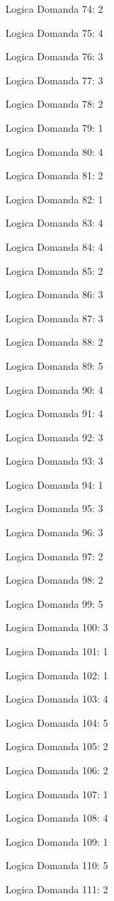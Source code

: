 \documentclass[20pt, a4paper]{article}
\begin{document}
\begin{itemize}[leftmargin=*]
\item [Logica] Domanda 74: 2
\item [Logica] Domanda 75: 4
\item [Logica] Domanda 76: 3
\item [Logica] Domanda 77: 3
\item [Logica] Domanda 78: 2
\item [Logica] Domanda 79: 1
\item [Logica] Domanda 80: 4
\item [Logica] Domanda 81: 2
\item [Logica] Domanda 82: 1
\item [Logica] Domanda 83: 4
\item [Logica] Domanda 84: 4
\item [Logica] Domanda 85: 2
\item [Logica] Domanda 86: 3
\item [Logica] Domanda 87: 3
\item [Logica] Domanda 88: 2
\item [Logica] Domanda 89: 5
\item [Logica] Domanda 90: 4
\item [Logica] Domanda 91: 4
\item [Logica] Domanda 92: 3
\item [Logica] Domanda 93: 3
\item [Logica] Domanda 94: 1
\item [Logica] Domanda 95: 3
\item [Logica] Domanda 96: 3
\item [Logica] Domanda 97: 2
\item [Logica] Domanda 98: 2
\item [Logica] Domanda 99: 5
\item [Logica] Domanda 100: 3
\item [Logica] Domanda 101: 1
\item [Logica] Domanda 102: 1
\item [Logica] Domanda 103: 4
\item [Logica] Domanda 104: 5
\item [Logica] Domanda 105: 2
\item [Logica] Domanda 106: 2
\item [Logica] Domanda 107: 1
\item [Logica] Domanda 108: 4
\item [Logica] Domanda 109: 1
\item [Logica] Domanda 110: 5
\item [Logica] Domanda 111: 2

\end{itemize}
\end{document}
